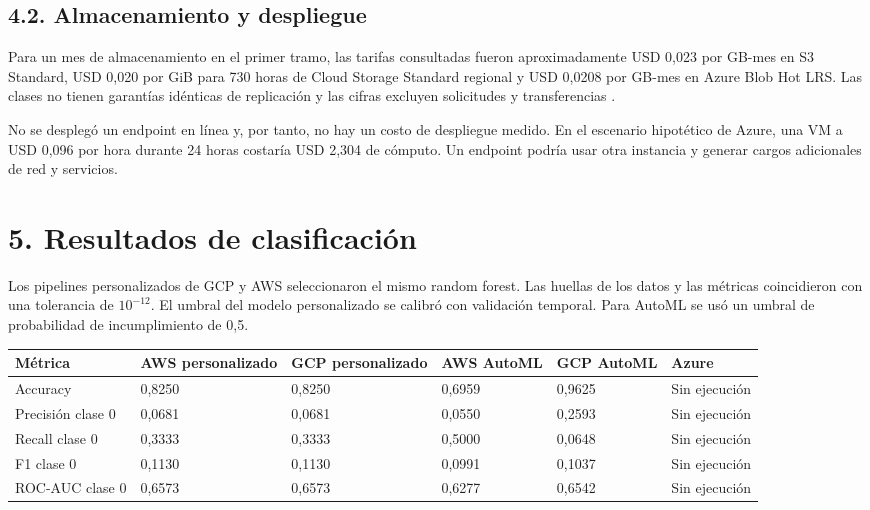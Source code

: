 \subsection{4.2. Almacenamiento y despliegue}

Para un mes de almacenamiento en el primer tramo, las tarifas consultadas fueron aproximadamente USD 0,023 por GB-mes en S3 Standard, USD 0,020 por GiB para 730 horas de Cloud Storage Standard regional y USD 0,0208 por GB-mes en Azure Blob Hot LRS. Las clases no tienen garantías idénticas de replicación y las cifras excluyen solicitudes y transferencias \cite{aws-s3,gcp-storage,azure-blob}.

No se desplegó un endpoint en línea y, por tanto, no hay un costo de despliegue medido. En el escenario hipotético de Azure, una VM a USD 0,096 por hora durante 24 horas costaría USD 2,304 de cómputo. Un endpoint podría usar otra instancia y generar cargos adicionales de red y servicios.

\section{5. Resultados de clasificación}

Los pipelines personalizados de GCP y AWS seleccionaron el mismo random forest. Las huellas de los datos y las métricas coincidieron con una tolerancia de \(10^{-12}\). El umbral del modelo personalizado se calibró con validación temporal. Para AutoML se usó un umbral de probabilidad de incumplimiento de 0,5.

\begin{fullwidth}\small
\setlength{\tabcolsep}{5pt}\renewcommand{\arraystretch}{1.2}
\begin{tabularx}{\linewidth}{@{}lXXXXX@{}}
\toprule
\textbf{Métrica} & \textbf{AWS personalizado} & \textbf{GCP personalizado} & \textbf{AWS AutoML} & \textbf{GCP AutoML} & \textbf{Azure} \\
\midrule
Accuracy & 0,8250 & 0,8250 & 0,6959 & 0,9625 & Sin ejecución \\
Precisión clase 0 & 0,0681 & 0,0681 & 0,0550 & 0,2593 & Sin ejecución \\
Recall clase 0 & 0,3333 & 0,3333 & 0,5000 & 0,0648 & Sin ejecución \\
F1 clase 0 & 0,1130 & 0,1130 & 0,0991 & 0,1037 & Sin ejecución \\
ROC-AUC clase 0 & 0,6573 & 0,6573 & 0,6277 & 0,6542 & Sin ejecución \\
\bottomrule
\end{tabularx}
\end{fullwidth}

